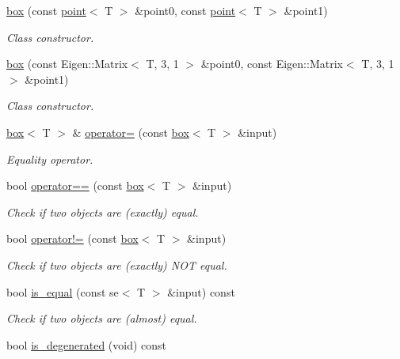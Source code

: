 \begin{DoxyCompactItemize}
\hyperlink{classddd_1_1box_a5af6ee4453ac4d80b9bb1ac858d253ac}{box} (const \hyperlink{classddd_1_1point}{point}$<$ T $>$ \&point0, const \hyperlink{classddd_1_1point}{point}$<$ T $>$ \&point1)
\begin{DoxyCompactList}\small\item\em Class constructor. \end{DoxyCompactList}\item 
\hyperlink{classddd_1_1box_ae1130e95b0dc6c43c4a805de9f5aed87}{box} (const Eigen\+::\+Matrix$<$ T, 3, 1 $>$ \&point0, const Eigen\+::\+Matrix$<$ T, 3, 1 $>$ \&point1)
\begin{DoxyCompactList}\small\item\em Class constructor. \end{DoxyCompactList}\item 
\hyperlink{classddd_1_1box}{box}$<$ T $>$ \& \hyperlink{classddd_1_1box_aa777c01953453974a45b593b9807c1c6}{operator=} (const \hyperlink{classddd_1_1box}{box}$<$ T $>$ \&input)
\begin{DoxyCompactList}\small\item\em Equality operator. \end{DoxyCompactList}\item 
bool \hyperlink{classddd_1_1box_ac29b13c5b75f74757e7b5ea3806f06f8}{operator==} (const \hyperlink{classddd_1_1box}{box}$<$ T $>$ \&input)
\begin{DoxyCompactList}\small\item\em Check if two objects are (exactly) equal. \end{DoxyCompactList}\item 
bool \hyperlink{classddd_1_1box_a2022b401ce06dc71649424da5cfeb604}{operator!=} (const \hyperlink{classddd_1_1box}{box}$<$ T $>$ \&input)
\begin{DoxyCompactList}\small\item\em Check if two objects are (exactly) N\+OT equal. \end{DoxyCompactList}\item 
bool \hyperlink{classddd_1_1box_ad7a33142f2d50b8d9e49d8ea089bdf7a}{is\+\_\+equal} (const se$<$ T $>$ \&input) const
\begin{DoxyCompactList}\small\item\em Check if two objects are (almost) equal. \end{DoxyCompactList}\item 
\mbox{\label{classddd_1_1box_aac355707418c3ce06ca2682b3519c2ef}} 
bool \hyperlink{classddd_1_1box_aac355707418c3ce06ca2682b3519c2ef}{is\+\_\+degenerated} (void) const

\end{DoxyCompactItemize}

